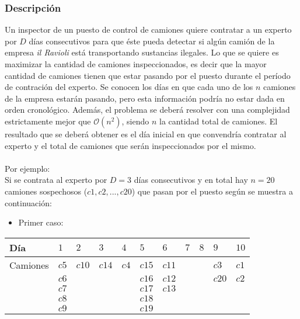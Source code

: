 \documentclass[11pt, a4paper, twoside]{article}
\begin{document}
{}

\subsubsection{Descripción}
Un inspector de un puesto de control de camiones quiere contratar a un experto por $D$ días consecutivos para que éste pueda detectar si algún camión de la empresa \textit{il Ravioli} está transportando sustancias ilegales. Lo que se quiere es maximizar la cantidad de camiones inspeccionados, es decir que la mayor cantidad de camiones tienen que estar pasando por el puesto durante el período de contración del experto. Se conocen los días en que cada uno de los $n$ camiones de la empresa estarán pasando, pero esta información podría no estar dada en orden cronológico. Además, el problema se deberá resolver con una complejidad estrictamente mejor que $\mathcal{O}(n^{2})$, siendo $n$ la cantidad total de camiones. El resultado que se deberá obtener es el día inicial en que convendría contratar al experto y el total de camiones que serán inspeccionados por el mismo.\\
\\
Por ejemplo: 
\\
Si se contrata al experto por $D=3$ días consecutivos y en total hay $n=20$ camiones sospechosos ($c1,c2,...,c20$) que pasan por el puesto según se muestra a continuación: \\ 

\begin{itemize}
	\item Primer caso:
\end{itemize} 

\begin{tabular}{|l|l|l|l|l|l|l|l|l|l|l|}
	\hline
	Día          &  $1$  & $2$   & $3$   & $4$   & $5$   & $6$ & $7$ & $8$ & $9$   & $10$  \\
	\hline
	Camiones     &  $c5$ & $c10$ & $c14$ & $c4$  & $c15$ & $c11$ &   &     & $c3$  & $c1$  \\
				 &  $c6$ &       &       &       & $c16$ & $c12$ &   &     & $c20$ & $c2$  \\    
				 &	$c7$ &       &       &       & $c17$ & $c13$ &   &     &       &       \\  
				 &	$c8$ &       &       &       & $c18$ &       &   &     &       &       \\
				 &	$c9$ &       &       &       & $c19$ &       &   &     &       &       \\
	\hline
\end{tabular} \\
\end{document}
